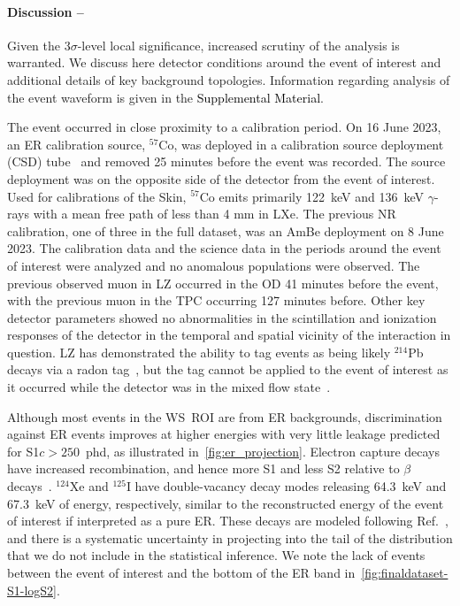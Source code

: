 \paragraph{Discussion --\label{sec:discussion}}
Given the 3$\sigma$-level local significance, increased scrutiny of the analysis is warranted. We discuss here detector conditions around the event of interest and additional details of key background topologies.
Information regarding analysis of the event waveform is given in the \textcolor{black}{Supplemental Material}.

The event occurred in close proximity to a calibration period. On 16 June 2023, an ER calibration source, $^{57}$Co, was deployed in a calibration source deployment (CSD) tube~\cite{LZ:Calibrations_2024} and removed 25 minutes before the event was recorded. The source deployment was on the opposite side of the detector from the event of interest. Used for calibrations of the Skin, $^{57}$Co emits primarily 122~keV and 136~keV $\gamma$-rays with a mean free path of less than 4 mm in LXe.
The previous NR calibration, one of three in the full dataset, was an AmBe deployment on 8 June 2023. 
The calibration data and the science data in the periods around the event of interest were analyzed and no anomalous populations were observed. The previous observed muon in LZ occurred in the OD 41 minutes before the event, with the previous muon in the TPC occurring 127 minutes before.
Other key detector parameters showed no abnormalities in the scintillation and ionization responses of the detector in the temporal and spatial vicinity of the interaction in question. LZ has demonstrated the ability to tag events as being likely $^{214}$Pb decays via a radon tag~\cite{LZ:2025xxf}, but the tag cannot be applied to the event of interest as it occurred while the detector was in the mixed flow state~\cite{LZ:SR3_WS2024}.




Although most events in the WS~ROI are from ER backgrounds, discrimination against ER events improves at higher energies with very little leakage predicted for S1$c>250$~phd, as illustrated in~\autoref{fig:er_projection}. Electron capture decays have increased recombination, and hence more S1 and less S2 relative to $\beta$ decays~\cite{LZ:2025hud}.  $^{124}$Xe and $^{125}$I have double-vacancy decay modes releasing 64.3~keV and 67.3~keV of energy, respectively, similar to the reconstructed energy of the event of interest if interpreted as a pure ER. These decays are modeled following Ref.~\cite{LZ:2025hud}, and there is a systematic uncertainty in projecting into the tail of the distribution that we do not include in the statistical inference. We note the lack of events between the event of interest and the bottom of the ER band in~\autoref{fig:finaldataset-S1-logS2}.

